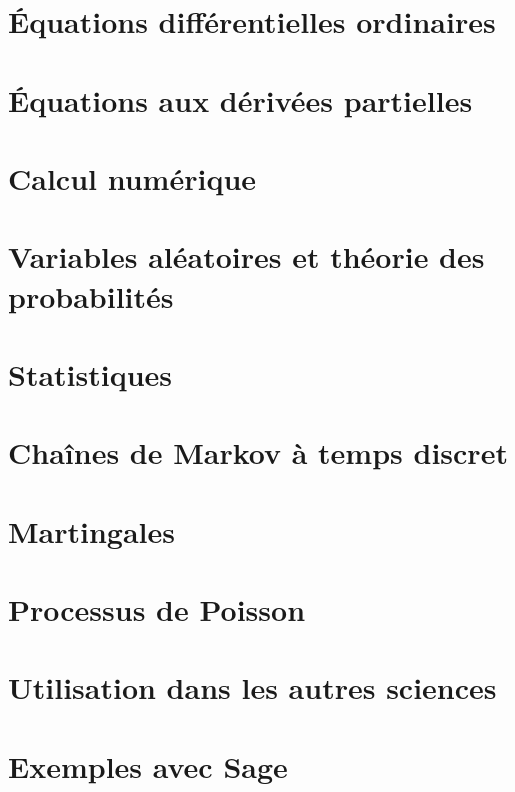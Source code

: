 \chapter{Équations différentielles ordinaires}





\chapter{Équations aux dérivées partielles}


\chapter{Calcul numérique}




\chapter{Variables aléatoires et théorie des probabilités}




\chapter{Statistiques}


\chapter{Chaînes de Markov à temps discret}


\chapter{Martingales}


\chapter{Processus de Poisson}


\chapter{Utilisation dans les autres sciences}



\chapter{Exemples avec Sage}


